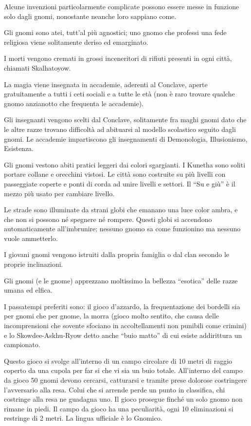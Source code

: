 Alcune invenzioni particolarmente complicate possono essere messe in
funzione solo dagli gnomi, nonostante neanche loro sappiano come.


\Religione Gli gnomi sono atei, tutt'al pi\`u agnostici; uno gnomo
che professi una fede religiosa viene solitamente deriso ed
emarginato.

I morti vengono
cremati in grossi inceneritori di rifiuti presenti in ogni citt\`a,
chiamati Skalhatoyow.
 
\Magia La magia viene insegnata in accademie, aderenti al Conclave,
aperte gratuitamente a tutti i ceti sociali e a tutte le et\`a (non
\`e raro trovare qualche gnomo anzianotto che frequenta le accademie).

Gli insegnanti vengono scelti dal Conclave, solitamente fra maghi
gnomi dato che le altre razze trovano difficolt\`a ad abituarsi al
modello scolastico seguito dagli gnomi.  Le accademie impartiscono gli
insegnamenti di Demonologia, Illusionismo, Esistenza.

\Moda Gli gnomi vestono abiti pratici leggeri dai colori sgargianti. I
Kunetha sono soliti portare collane e orecchini vistosi. Le citt\`a
sono costruite su pi\`u livelli con passeggiate coperte e ponti di
corda ad unire livelli e settori. Il ``Su e gi\`u'' \`e il mezzo pi\`u
usato per cambiare livello.

Le strade sono illuminate da strani globi che emanano una luce color
ambra, e che non si possono n\'e spegnere n\'e rompere. Questi
globi si accendono automaticamente all'imbrunire; nessuno gnomo sa
come funzionino ma nessuno vuole ammetterlo.

I giovani gnomi vengono istruiti dalla propria famiglia o dal clan
secondo le proprie inclinazioni. 

Gli gnomi (e le gnome) apprezzano moltissimo la bellezza ``esotica''
delle razze umana ed elfica.

I passatempi preferiti sono: il gioco d'azzardo, la frequentazione dei
bordelli sia per gnomi che per gnome, la morra (gioco molto sentito,
che causa delle incomprensioni che sovente sfociano in accoltellamenti
non punibili come crimini) e lo Skowdee-Askhu-Ryow detto
anche ``buio matto'' di cui esiste addirittura un campionato. 

Questo gioco si svolge all'interno di un campo circolare di 10 metri
di raggio coperto da una cupola per far si che vi sia un buio totale.
All'interno del campo da gioco 50 gnomi devono cercarsi, catturarsi e
tramite prese dolorose costringere l'avversario alla resa. Colui che
si arrende perde un punto in classifica, chi costringe alla resa ne
guadagna uno. Il gioco prosegue finch\'e un solo gnomo non rimane in
piedi. Il campo da gioco ha una peculiarit\`a, ogni 10 eliminazioni si
restringe di 2 metri. La lingua ufficiale \`e lo Gnomico.

